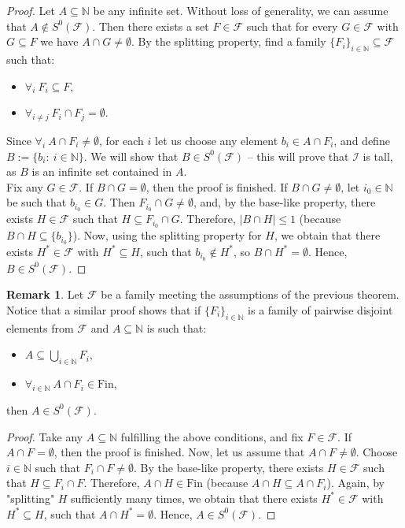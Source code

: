 \documentclass{amsart}
\theoremstyle{definition}
\newtheorem{remark}[thm]{Remark}
\newcommand{\N}{{\mathbb N}}
\newcommand{\Fin}{\textrm{Fin}}
\newcommand{\I}{\mathcal I}
\newcommand{\MB}{S^0}
\begin{document}
\begin{proof}
Let $A \subseteq\N$ be any infinite set. 
Without loss of generality, we can assume that $A\notin \MB(\mathcal{F})$. Then there exists a set $F\in\mathcal{F}$ such that for every $G\in\mathcal{F}$ with $G\subseteq F$ we have $A\cap G \neq\emptyset$. By the splitting property, find a family $\{F_i\}_{i\in\N} \subseteq\mathcal{F}$ such that:
\begin{itemize}
\item $\forall_{i}\ F_i \subseteq F$,
\item $\forall_{i\neq j}\ F_i\cap F_j =\emptyset$.
\end{itemize}
Since $\forall_{i}\ A\cap F_i \neq\emptyset$, for each $i$ let us choose any element $b_i \in A\cap F_i$, and define $B:=\{b_i :\ i\in\N\}$. We will show that $B\in\MB(\mathcal{F})$ -- this will prove that $\I$ is tall, as $B$ is an infinite set contained in $A$.\\
Fix any $G\in \mathcal{F}$. If $B\cap G=\emptyset$, then the proof is finished. If $B\cap G \neq\emptyset$, let $i_0\in\N$ be such that $b_{i_0}\in G$. Then $F_{i_0}\cap G \neq\emptyset$, and, by the base-like property, there exists $H\in\mathcal{F}$ such that $H\subseteq F_{i_0}\cap G$. Therefore, $|B\cap H|\leq 1$ (because $B\cap H\subseteq\{b_{i_0}\}$). Now, using the splitting property for $H$, we obtain that there exists $H^*\in\mathcal{F}$ with $H^*\subseteq H$, such that $b_{i_0}\notin H^*$, so $B\cap H^* =\emptyset$. Hence, $B\in\MB(\mathcal{F})$.
\end{proof}

\begin{remark}\label{remtall+}
Let $\mathcal{F}$ be a family meeting the assumptions of the previous theorem.
Notice that a similar proof shows that if $\{F_i\}_{i\in\N}$ is a family of pairwise disjoint elements from $\mathcal{F}$ and $A\subseteq \N$ is such that:
\begin{itemize}
	\item $A\subseteq \bigcup_{i\in\N}{F_i}$,
	\item $\forall_{i\in\N}\ A\cap F_i\in\Fin$,
\end{itemize}
then $A\in\MB(\mathcal{F})$.
\end{remark}

\begin{proof}
Take any $A\subseteq\N$ fulfilling the above conditions, and fix $F\in\mathcal{F}$. If $A\cap F=\emptyset$, then the proof is finished. Now, let us assume that $A\cap F \neq\emptyset$. Choose $i\in\N$ such that $F_i\cap F \neq\emptyset$. By the base-like property, there exists $H\in\mathcal{F}$ such that $H\subseteq F_i\cap F$. Therefore, $A\cap H\in\Fin$ (because $A\cap H\subseteq A\cap F_i$). Again, by "splitting" $H$ sufficiently many times, we obtain that there exists $H^*\in\mathcal{F}$ with $H^*\subseteq H$, such that $A\cap H^* =\emptyset$. Hence, $A\in\MB(\mathcal{F})$.
\end{proof}
\end{document}
